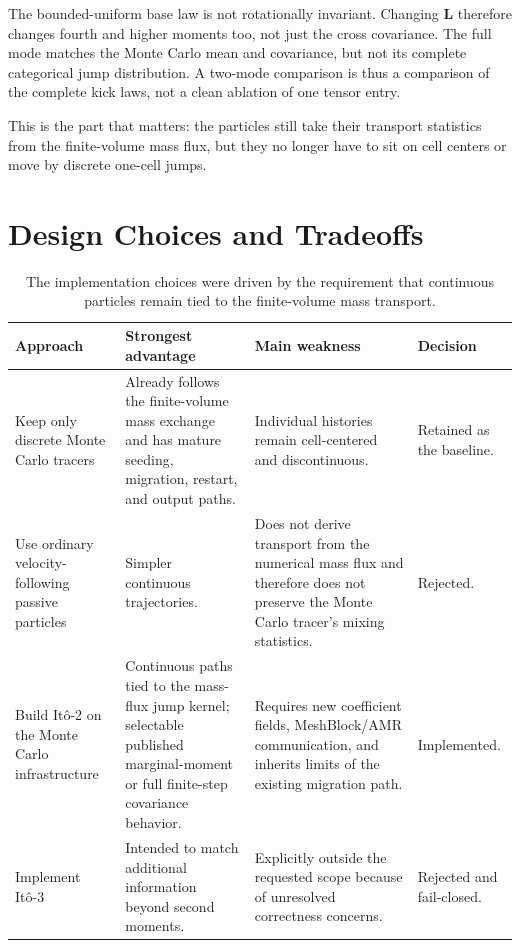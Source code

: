 \documentclass[11pt]{article}
\newcommand{\Ito}{It\^o}
\begin{document}
The bounded-uniform base law is not rotationally invariant. Changing
\(\mathbf L\) therefore changes fourth and higher moments too, not just the
cross covariance. The full mode matches the Monte Carlo mean and covariance,
but not its complete categorical jump distribution. A two-mode comparison is
thus a comparison of the complete kick laws, not a clean ablation of one tensor
entry.

This is the part that matters: the particles still take their transport
statistics from the finite-volume mass flux, but they no longer have to sit on
cell centers or move by discrete one-cell jumps.

\section{Design Choices and Tradeoffs}

\begin{table}[htbp]
\centering
\small
\begin{tabularx}{\textwidth}{@{}p{}X X p{}@{}}
\toprule
Approach & Strongest advantage & Main weakness & Decision \\
\midrule
Keep only discrete Monte Carlo tracers
& Already follows the finite-volume mass exchange and has mature
  seeding, migration, restart, and output paths.
& Individual histories remain cell-centered and discontinuous.
& Retained as the baseline. \\
\addlinespace
Use ordinary velocity-following passive particles
& Simpler continuous trajectories.
& Does not derive transport from the numerical mass flux and therefore
  does not preserve the Monte Carlo tracer's mixing statistics.
& Rejected. \\
\addlinespace
Build \Ito{}-2 on the Monte Carlo infrastructure
& Continuous paths tied to the mass-flux jump kernel; selectable published
  marginal-moment or full finite-step covariance behavior.
& Requires new coefficient fields, MeshBlock/AMR communication, and
  inherits limits of the existing migration path.
& Implemented. \\
\addlinespace
Implement \Ito{}-3
& Intended to match additional information beyond second moments.
& Explicitly outside the requested scope because of unresolved correctness
  concerns.
& Rejected and fail-closed. \\
\bottomrule
\end{tabularx}
\caption{The implementation choices were driven by the requirement that
continuous particles remain tied to the finite-volume mass transport.}
\end{table}
\end{document}
